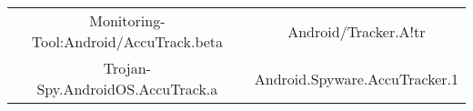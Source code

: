 \begin{tabular}{ c c }
    Monitoring-Tool:Android/AccuTrack.beta & Android/Tracker.A!tr \\ 
    Trojan-Spy.AndroidOS.AccuTrack.a & Android.Spyware.AccuTracker.1 \\ 
\end{tabular}
